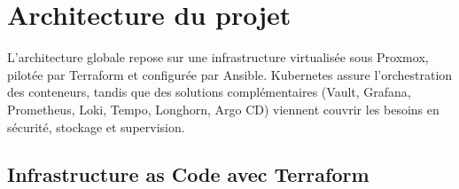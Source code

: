 



\section{Architecture du projet}

L'architecture globale repose sur une infrastructure virtualisée sous Proxmox, pilotée par Terraform et configurée par Ansible. Kubernetes assure l'orchestration des conteneurs, tandis que des solutions complémentaires (Vault, Grafana, Prometheus, Loki, Tempo, Longhorn, Argo CD) viennent couvrir les besoins en sécurité, stockage et supervision.


\subsection{Infrastructure as Code avec Terraform}

